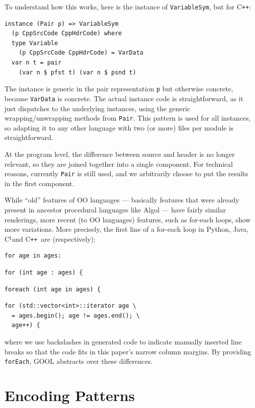 \documentclass[sigplan,review,anonymous,prologue,dvipsnames]{acmart}
\newcommand{\Csharp}{C$^{\sharp}$}
\newcommand{\Cplusplus}{C\texttt{++}}
\begin{document}
To understand how this works, here is the instance of \verb|VariableSym|,
but for \Cplusplus:
\begin{lstlisting}
instance (Pair p) => VariableSym 
  (p CppSrcCode CppHdrCode) where
  type Variable 
    (p CppSrcCode CppHdrCode) = VarData
  var n t = pair 
    (var n $ pfst t) (var n $ psnd t)
\end{lstlisting}
The instance is generic in the pair representation \verb|p| but
otherwise concrete, because \verb|VarData| is concrete. The actual
instance code is straightforward, as it just dispatches to the 
underlying instances, using the generic wrapping/unwrapping
methods from \verb|Pair|.  This pattern is used for all instances,
so adapting it to any other language with two (or more) files per
module is straightforward.

At the program level, the difference between source and header is no
longer relevant, so they are joined together into a single component.
For technical reasons, currently \verb|Pair| is still used, and we arbitrarily
choose to put the results in the first component.

While ``old'' features of OO languages --- basically features that
were already present in ancestor procedural languages like Algol ---
have fairly similar renderings, more recent (to OO languages) features,
such as for-each loops, show more variations.  More precisely,
the first line of a for-each loop in Python, Java, \Csharp and
\Cplusplus~are (respectively):
\begin{lstlisting}
for age in ages:
\end{lstlisting}
\begin{lstlisting}
for (int age : ages) {
\end{lstlisting}
\begin{lstlisting}
foreach (int age in ages) {
\end{lstlisting}
\begin{lstlisting}
for (std::vector<int>::iterator age \
  = ages.begin(); age != ages.end(); \
  age++) {
\end{lstlisting}
where we use backslashes in generated code to indicate manually inserted
line breaks so that the code fits in this paper's narrow column margins. By 
providing \verb|forEach|, GOOL abstracts over these differences.

\section{Encoding Patterns} \label{sec:patterns}
\end{document}
